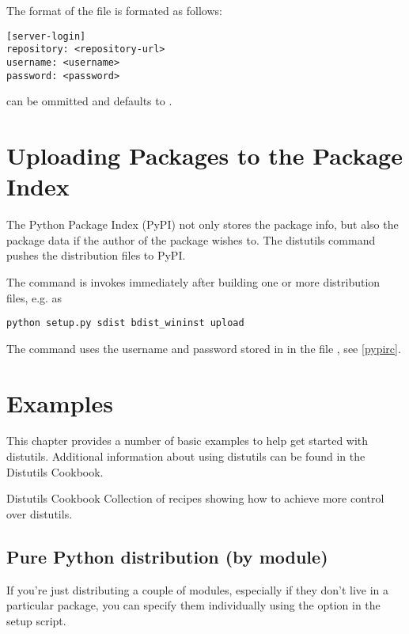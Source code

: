\documentclass{manual}
\begin{document}
The format of the  file is formated as follows:

\begin{verbatim}
[server-login]
repository: <repository-url>
username: <username>
password: <password>
\end{verbatim}

 can be ommitted and defaults to
.

\chapter{Uploading Packages to the Package Index}
\label{package-upload}

The Python Package Index (PyPI) not only stores the package info, but also 
the package data if the author of the package wishes to. The distutils
command  pushes the distribution files to PyPI.

The command is invokes immediately after building one or more distribution
files, e.g. as

\begin{verbatim}
python setup.py sdist bdist_wininst upload
\end{verbatim}

The  command uses the username and password stored in
in the file , see \ref{pypirc}.

\chapter{Examples}
\label{examples}

This chapter provides a number of basic examples to help get started
with distutils.  Additional information about using distutils can be
found in the Distutils Cookbook.

\begin{seealso}
          {Distutils Cookbook}
          {Collection of recipes showing how to achieve more control
           over distutils.}
\end{seealso}


\section{Pure Python distribution (by module)}
\label{pure-mod}

If you're just distributing a couple of modules, especially if they
don't live in a particular package, you can specify them individually
using the  option in the setup script.
\end{document}
